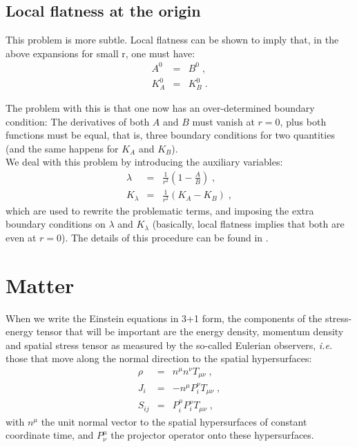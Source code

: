 \documentclass[12pt]{article}
\begin{document}
\subsection{Local flatness at the origin}

This problem is more subtle.  Local flatness can be shown to imply
that, in the above expansions for small r, one must have:
\begin{eqnarray}
A^0 &=& B^0 \; , \\
K_A^0 &=& K_B^0 \; .
\end{eqnarray}

The problem with this is that one now has an over-determined boundary
condition: The derivatives of both $A$ and $B$ must vanish at $r=0$,
plus both functions must be equal, that is, three boundary conditions
for two quantities (and the same happens for $K_A$ and $K_B$). \\

We deal with this problem by introducing the auxiliary variables:
\begin{eqnarray}
\lambda &=& \frac{1}{r^2} \left( 1-\frac{A}{B} \right) \; , \\
K_\lambda &=& \frac{1}{r^2} \left( K_A - K_B \right) \; ,
\end{eqnarray}
which are used to rewrite the problematic terms, and imposing the
extra boundary conditions on $\lambda$ and $K_\lambda$ (basically,
local flatness implies that both are even at $r=0$).  The details of
this procedure can be found in \cite{Alcubierre05,Alcubierre08}. \\



\setcounter{equation}{0}
\section{Matter}
\label{sec:matter}

When we write the Einstein equations in 3+1 form, the components of
the stress-energy tensor that will be important are the energy density,
momentum density and spatial stress tensor as measured by the
so-called Eulerian observers, {\em i.e.} those that move along
the normal direction to the spatial hypersurfaces:
\begin{eqnarray}
\rho &=& n^\mu n^\nu T_{\mu \nu} \; , \\
J_i &=& - n^\mu P_i^\nu T_{\mu \nu} \; , \\
S_{ij} &=& P_i^\mu P_i^\nu T_{\mu \nu} \; ,
\end{eqnarray}
with $n^\mu$ the unit normal vector to the spatial hypersurfaces of
constant coordinate time, and $P^\mu_\nu$ the projector operator onto
these hypersurfaces. \\
\end{document}
